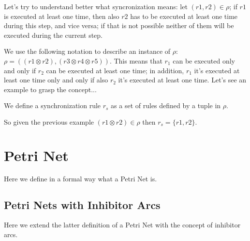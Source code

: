 Let's try to understand better what syncronization means:
let $(r1,r2) \in \rho$; if $r1$ is executed at least one time, then also
$r2$ has to be executed at least one time during this step, and vice versa; if that is not possible neither of them will be executed during the current step.

We use the following notation to describe an instance of $\rho$: 
$\rho=((r1 \otimes r2),(r3 \otimes r4 \otimes r5))$.
This means that $r_1$ can be executed only and only if $r_2$ can be executed at least one time;
in addition, $r_1$ it's executed at least one time only and only if also $r_2$ it's executed at least one time.
Let's see an example to grasp the concept...

\begin{definition}
\label{def:sync_rule}
We define a synchronization rule $r_s$ as a set of rules defined by a tuple in $\rho$.
\end{definition}

So given the previous example $(r1 \otimes r2) \in \rho$ then $r_s=\{r1,r2\}$.

\section{Petri Net}

Here we define in a formal way what a Petri Net is.

\subsection{Petri Nets with Inhibitor Arcs}

Here we extend the latter definition of a Petri Net with the concept of inhibitor arcs.
